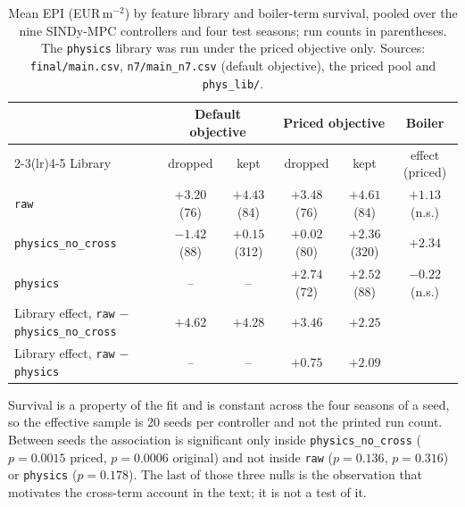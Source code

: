 \begin{table}[t]
\centering
\caption{Mean EPI (EUR\,m$^{-2}$) by feature library and boiler-term survival, pooled over
the nine SINDy-MPC controllers and four test seasons; run counts in parentheses. The
\texttt{physics} library was run under the priced objective only. Sources:
\texttt{final/main.csv}, \texttt{n7/main\_n7.csv} (default objective), the priced pool and
\texttt{phys\_lib/}.}
\label{tab:twobytwo}
\small
\begin{tabular}{@{}lccccc@{}}
\toprule
 & \multicolumn{2}{c}{Default objective} & \multicolumn{2}{c}{Priced objective} & Boiler \\
\cmidrule(lr){2-3}\cmidrule(lr){4-5}
Library & dropped & kept & dropped & kept & effect (priced) \\
\midrule
\texttt{raw}                & $+3.20$ (76) & $+4.43$ (84)  & $+3.48$ (76) & $\mathbf{+4.61}$ (84) & $+1.13$ (n.s.) \\
\texttt{physics\_no\_cross} & $-1.42$ (88) & $+0.15$ (312) & $+0.02$ (80) & $+2.36$ (320) & $\mathbf{+2.34}$ \\
\texttt{physics}            & -- & -- & $+2.74$ (72) & $+2.52$ (88)  & $-0.22$ (n.s.) \\
\midrule
Library effect, \texttt{raw} $-$ \texttt{physics\_no\_cross} & $+4.62$ & $+4.28$ & $+3.46$ & $+2.25$ & \\
Library effect, \texttt{raw} $-$ \texttt{physics}            & -- & -- & $+0.75$ & $+2.09$ & \\
\bottomrule
\end{tabular}

\vspace{2pt}
\begin{minipage}{\linewidth}\footnotesize
Survival is a property of the fit and is constant across the four seasons of a seed, so
the effective sample is 20 seeds per controller and not the printed run count. Between
seeds the association is significant only inside \texttt{physics\_no\_cross}
($p=0.0015$ priced, $p=0.0006$ original) and not inside \texttt{raw} ($p=0.136$, $p=0.316$)
or \texttt{physics} ($p=0.178$). The last of those three nulls is the observation that
motivates the cross-term account in the text; it is not a test of it.
\end{minipage}
\end{table}

